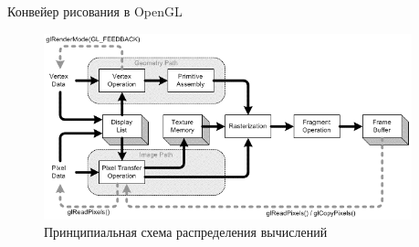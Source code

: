 \documentclass{beamer}
\begin{document}
\begin{frame}{Конвейер рисования в OpenGL}{}
	\begin{figure} 
		\includegraphics[width=0.95\textwidth]{images/OpenGL_graphics_pipeline.png}
		\caption {Принципиальная схема распределения вычислений}
	\end{figure}
\end{frame}
\end{document}
